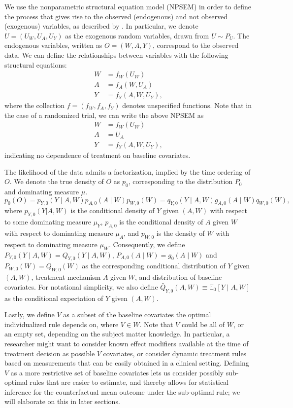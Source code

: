 \documentclass[
  12pt, krantz2,
]{krantz}
\theoremstyle{definition}
\theoremstyle{definition}
\theoremstyle{definition}
\newcommand{\E}{\mathbb{E}}
\newcommand{\1}{\mathbbm{1}}
\begin{document}
We use the nonparametric structural equation model (NPSEM) in order to define
the process that gives rise to the observed (endogenous) and not observed
(exogenous) variables, as described by \citet{pearl2009causality}. In particular, we
denote \(U=(U_W,U_A,U_Y)\) as the exogenous random variables, drawn from \(U \sim P_U\).
The endogenous variables, written as \(O=(W,A,Y)\), correspond to the observed data.
We can define the relationships between variables with the following structural equations:
\begin{align}
  W &= f_W(U_W) \\ A &= f_A(W, U_A) \\ Y &= f_Y(A, W, U_Y),
  \label{eq:npsem-mopttx}
\end{align}
where the collection \(f=(f_W,f_A,f_Y)\) denotes unspecified functions. Note that
in the case of a randomized trial, we can write the above NPSEM as
\begin{align}
  W &= f_W(U_W) \\ A &= U_A \\ Y &= f_Y(A, W, U_Y),
  \label{eq:npsem-rt-mopttx}
\end{align}
indicating no dependence of treatment on baseline covariates.

The likelihood of the data admits a factorization, implied by the time ordering
of \(O\). We denote the true density of \(O\) as \(p_0\), corresponding to the
distribution \(P_0\) and dominating measure \(\mu\).
\begin{equation}
  p_0(O) = p_{Y,0}(Y \mid A,W) p_{A,0}(A \mid W) p_{W,0}(W) =
    q_{Y,0}(Y \mid A,W) g_{A,0}(A \mid W) q_{W,0}(W),
  \label{eq:likelihood-factorization-mopttx}
\end{equation}
where \(p_{Y,0}(Y|A,W)\) is the conditional density of \(Y\) given \((A, W)\) with
respect to some dominating measure \(\mu_Y\), \(p_{A,0}\) is the conditional density
of \(A\) given \(W\) with respect to dominating measure \(\mu_A\), and \(p_{W,0}\) is
the density of \(W\) with respect to dominating measure \(\mu_W\). Consequently, we
define \(P_{Y,0}(Y \mid A, W) = Q_{Y,0}(Y \mid A,W)\), \(P_{A,0}(A \mid W) = g_0(A \mid W)\) and \(P_{W,0}(W)=Q_{W,0}(W)\) as the corresponding conditional
distribution of \(Y\) given \((A,W)\), treatment mechanism \(A\) given \(W\), and
distribution of baseline covariates. For notational simplicity, we also define
\(\bar{Q}_{Y,0}(A,W) \equiv \E_0[Y \mid A,W]\) as the conditional expectation of
\(Y\) given \((A,W)\).

Lastly, we define \(V\) as a subset of the baseline covariates the optimal
individualized rule depends on, where \(V \in W\). Note that \(V\) could be all of
\(W\), or an empty set, depending on the subject matter knowledge. In particular,
a researcher might want to consider known effect modifiers available at the time
of treatment decision as possible \(V\) covariates, or consider dynamic treatment
rules based on measurements that can be easily obtained in a clinical setting.
Defining \(V\) as a more restrictive set of baseline covariates lets us consider
possibly sub-optimal rules that are easier to estimate, and thereby allows for
statistical inference for the counterfactual mean outcome under the sub-optimal rule;
we will elaborate on this in later sections.
\end{document}
